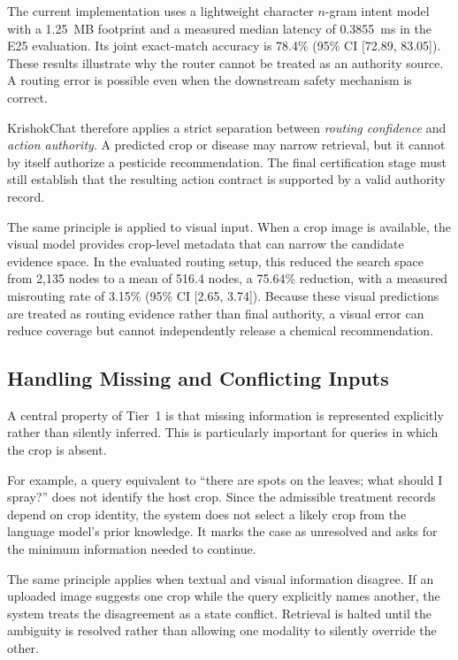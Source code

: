 \documentclass[a4paper,fleqn]{cas-dc}
\begin{document}
The current implementation uses a lightweight character $n$-gram intent model with a 1.25~MB footprint and a measured median latency of 0.3855~ms in the E25 evaluation. Its joint exact-match accuracy is 78.4\% (95\% CI [72.89, 83.05]). These results illustrate why the router cannot be treated as an authority source. A routing error is possible even when the downstream safety mechanism is correct.

KrishokChat therefore applies a strict separation between \emph{routing confidence} and \emph{action authority}. A predicted crop or disease may narrow retrieval, but it cannot by itself authorize a pesticide recommendation. The final certification stage must still establish that the resulting action contract is supported by a valid authority record.

The same principle is applied to visual input. When a crop image is available, the visual model provides crop-level metadata that can narrow the candidate evidence space. In the evaluated routing setup, this reduced the search space from 2{,}135 nodes to a mean of 516.4 nodes, a 75.64\% reduction, with a measured misrouting rate of 3.15\% (95\% CI [2.65, 3.74]). Because these visual predictions are treated as routing evidence rather than final authority, a visual error can reduce coverage but cannot independently release a chemical recommendation.

\subsection{Handling Missing and Conflicting Inputs}

A central property of Tier~1 is that missing information is represented explicitly rather than silently inferred. This is particularly important for queries in which the crop is absent.

For example, a query equivalent to ``there are spots on the leaves; what should I spray?'' does not identify the host crop. Since the admissible treatment records depend on crop identity, the system does not select a likely crop from the language model's prior knowledge. It marks the case as unresolved and asks for the minimum information needed to continue.

The same principle applies when textual and visual information disagree. If an uploaded image suggests one crop while the query explicitly names another, the system treats the disagreement as a state conflict. Retrieval is halted until the ambiguity is resolved rather than allowing one modality to silently override the other.
\end{document}
